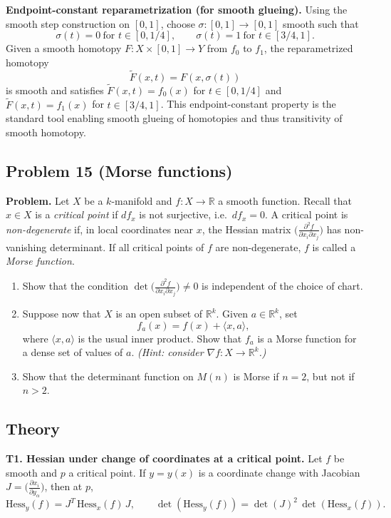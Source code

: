\documentclass[12pt,a4paper]{article}
\theoremstyle{plain}
\theoremstyle{definition}      %
\begin{document}
	\medskip
	\noindent\textbf{Endpoint-constant reparametrization (for smooth glueing).}
	Using the smooth step construction on $[0,1]$, choose $\sigma:[0,1]\to[0,1]$ smooth such that
	\[
	\sigma(t)=0\ \text{for }t\in[0,1/4],\qquad \sigma(t)=1\ \text{for }t\in[3/4,1].
	\]
	Given a smooth homotopy $F:X\times[0,1]\to Y$ from $f_0$ to $f_1$, the reparametrized homotopy
	\[
	\widetilde{F}(x,t)=F(x,\sigma(t))
	\]
	is smooth and satisfies $\widetilde{F}(x,t)=f_0(x)$ for $t\in[0,1/4]$ and $\widetilde{F}(x,t)=f_1(x)$ for $t\in[3/4,1]$.
	This endpoint-constant property is the standard tool enabling smooth glueing of homotopies and thus transitivity of smooth homotopy.
	
	
	\subsection*{Problem 15 (Morse functions)}
	
	\noindent\textbf{Problem.}
	Let $X$ be a $k$-manifold and $f:X\to\mathbb{R}$ a smooth function.
	Recall that $x\in X$ is a \emph{critical point} if $df_x$ is not surjective, i.e.\ $df_x=0$.
	A critical point is \emph{non-degenerate} if, in local coordinates near $x$, the Hessian matrix
	$\big(\frac{\partial^2 f}{\partial x_i\partial x_j}\big)$ has non-vanishing determinant.
	If all critical points of $f$ are non-degenerate, $f$ is called a \emph{Morse function}.
	
	\begin{enumerate}
		\item Show that the condition $\det\!\big(\frac{\partial^2 f}{\partial x_i\partial x_j}\big)\neq 0$
		is independent of the choice of chart.
		\item Suppose now that $X$ is an open subset of $\mathbb{R}^k$. Given $a\in\mathbb{R}^k$, set
		\[
		f_a(x)=f(x)+\langle x,a\rangle,
		\]
		where $\langle x,a\rangle$ is the usual inner product. Show that $f_a$ is a Morse function for a dense set
		of values of $a$. \emph{(Hint: consider $\nabla f:X\to\mathbb{R}^k$.)}
		\item Show that the determinant function on $M(n)$ is Morse if $n=2$, but not if $n>2$.
	\end{enumerate}
	
	\medskip
	\subsection*{Theory}
	
	\noindent\textbf{T1. Hessian under change of coordinates at a critical point.}
	Let $f$ be smooth and $p$ a critical point. If $y=y(x)$ is a coordinate change with Jacobian
	$J=\big(\frac{\partial x_i}{\partial y_\alpha}\big)$, then at $p$,
	\[
	\mathrm{Hess}_y(f)=J^T\,\mathrm{Hess}_x(f)\,J,
	\qquad
	\det(\mathrm{Hess}_y(f))=\det(J)^2\,\det(\mathrm{Hess}_x(f)).
	\]
	
\end{document}
